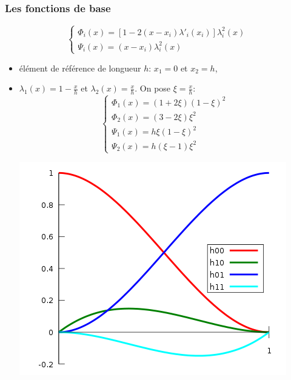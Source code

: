 \documentclass{beamer}
\begin{document}
\begin{frame}
\frametitle{Les fonctions de base}
\[\left\{\begin{array}{l}
\Phi_i(x) = \left[1-2(x-x_i)\lambda'_i(x_i)\right]\lambda^2_i(x) \\
\Psi_i(x) = (x-x_i)\lambda^2_i(x) 
\end{array}\right.
 \]
 \begin{itemize}
 \item élément de référence de longueur $h$:  $x_1=0$ et $x_2=h$, 
 \item $\lambda_1(x)=1-\frac{x}{h}$ et $\lambda_2(x)=\frac{x}{h}$. On pose $\xi= \frac{x}{h}$:
 \[\left\{\begin{array}{l}
\Phi_1(x) = (1+2\xi)(1-\xi)^2 \\
\Phi_2(x) = (3-2\xi)\xi^2 \\
\Psi_1(x) = h \xi(1-\xi)^2\\
\Psi_2(x) = h (\xi-1)\xi^2
\end{array}\right.
 \]
 \begin{center}
\includegraphics[scale=0.25]{HermiteBasis.png} 
\end{center}
 \end{itemize}

\end{frame}
\end{document}
